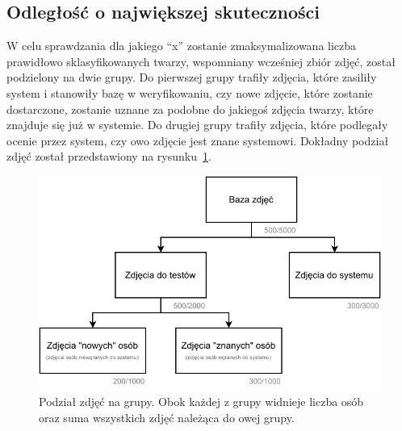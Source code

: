 \subsection{Odległość o największej skuteczności}

W celu sprawdzania dla jakiego ``x'' zostanie zmaksymalizowana liczba prawidłowo sklasyfikowanych twarzy,
wspomniany wcześniej zbiór zdjęć, został podzielony na dwie grupy.
%
Do pierwszej grupy trafiły zdjęcia, które zasiliły system i stanowiły bazę
w weryfikowaniu, czy nowe zdjęcie, które zostanie dostarczone,
zostanie uznane za podobne do jakiegoś zdjęcia twarzy, które znajduje się już w systemie.
Do drugiej grupy trafiły zdjęcia, które podlegały ocenie przez system, czy owo zdjęcie jest znane systemowi.
Dokładny podział zdjęć został przedstawiony na rysunku~\ref{fig:podzial_zdjec}.

\begin{figure}[H]
    \centering
    \includegraphics[width=1\textwidth]{images/podzial_zdjec}
    \caption{
        Podział zdjęć na grupy. Obok każdej z grupy widnieje liczba osób oraz suma
        wszystkich zdjęć należąca do owej grupy.
    }
    \customsource
    \label{fig:podzial_zdjec}
\end{figure}


